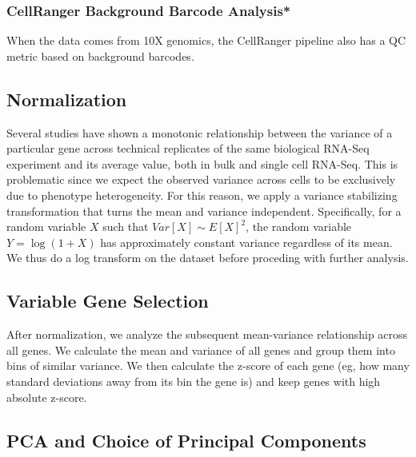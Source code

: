 \subsubsection{CellRanger Background Barcode Analysis*}
When the data comes from 10X genomics, the CellRanger pipeline also has a QC metric based on background barcodes. 

\subsection{Normalization}
Several studies have shown a monotonic relationship between the variance of a particular gene across technical replicates of the same biological RNA-Seq experiment and its average value, both in bulk \cite{} and single cell RNA-Seq\cite{}. This is problematic since we expect the observed variance across cells to be exclusively due to phenotype heterogeneity. For this reason, we apply a variance stabilizing transformation that turns the mean and variance independent. Specifically, for a random variable $X$ such that $Var[X] \sim E[X]^2$, the random variable $Y = \log(1+X)$ has approximately constant variance regardless of its mean. We thus do a log transform on the dataset before proceding with further analysis.

\subsection{Variable Gene Selection}
After normalization, we analyze the subsequent mean-variance relationship across all genes. We calculate the mean and variance of all genes and group them into bins of similar variance. We then calculate the z-score of each gene (eg, how many standard deviations away from its bin the gene is) and keep genes with high absolute z-score. 

\subsection{PCA and Choice of Principal Components}
